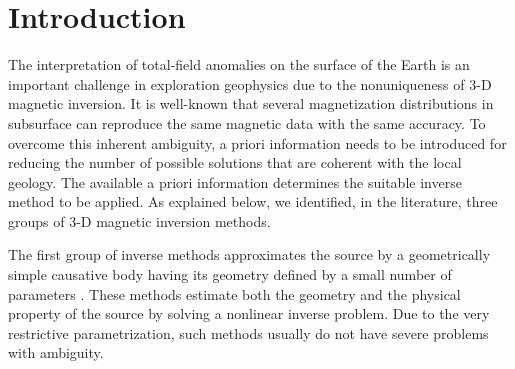 \section{Introduction}

The interpretation of total-field anomalies on the surface of the Earth is an 
important challenge in exploration geophysics due to the nonuniqueness of 3-D magnetic 
inversion. It is well-known that several magnetization distributions in subsurface 
can reproduce the same magnetic data with the same accuracy. 
To overcome this inherent ambiguity, a priori information needs to be introduced 
for reducing the number of possible solutions that are coherent with the local geology.
The available a priori information determines the suitable inverse method to be applied. 
As explained below, we identified, in the literature, three groups of 3-D magnetic inversion methods.

The first group of inverse methods approximates the source by a geometrically 
simple causative body having its geometry defined by a small number of parameters 
\cite[e.g., ][]{ballantyne-1980,bhattacharyya-1980,silva-1983}. These methods 
estimate both the geometry and the physical property of the source by solving 
a nonlinear inverse problem. Due to the very restrictive parametrization, 
such methods usually do not have severe problems with ambiguity.

